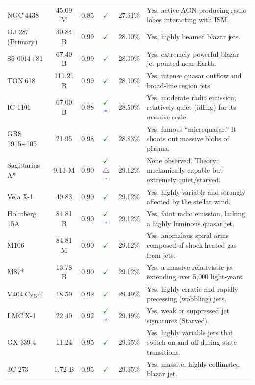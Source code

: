 \documentclass[11pt, a4paper]{article}
\begin{document}
\begin{landscape}
\begin{longtable}[l]{@{} l c c c c p{14cm} @{}}
  NGC 4438 & 45.09 M & 0.85 & \textcolor{green}{\Large $\checkmark$} & 27.61\% & Yes, active AGN producing radio lobes interacting with ISM. \\
  OJ 287 (Primary) & 30.84 B & 0.99 & \textcolor{green}{\Large $\checkmark$} & 28.00\% & Yes, highly beamed blazar jets. \\
  S5 0014+81 & 67.40 B & 0.99 & \textcolor{green}{\Large $\checkmark$} & 28.00\% & Yes, extremely powerful blazar jet pointed near Earth. \\
  TON 618 & 111.21 B & 0.99 & \textcolor{green}{\Large $\checkmark$} & 28.00\% & Yes, intense quasar outflow and broad-line region jets. \\
  IC 1101 & 67.00 B & 0.88 & \textcolor{green}{\Large $\checkmark$} \textcolor{blue}{\Large $*$} & 28.50\% & Yes, moderate radio emission; relatively quiet (idling) for its massive scale. \\
  GRS 1915+105 & 21.95 & 0.98 & \textcolor{green}{\Large $\checkmark$} & 28.83\% & Yes, famous ``microquasar.'' It shoots out massive blobs of plasma. \\
  Sagittarius A* & 9.11 M & 0.90 & \textcolor{green}{\Large $\checkmark$} \textcolor{purple}{\Large $\triangle$} \textcolor{blue}{\Large $*$} & 29.12\% & None observed. Theory: mechanically capable but extremely quiet/starved. \\
  Vela X-1 & 49.83 & 0.90 & \textcolor{green}{\Large $\checkmark$} & 29.12\% & Yes, highly variable and strongly affected by the stellar wind. \\
  Holmberg 15A & 84.81 B & 0.90 & \textcolor{green}{\Large $\checkmark$} \textcolor{blue}{\Large $*$} & 29.12\% & Yes, faint radio emission, lacking a highly luminous quasar jet. \\
  M106 & 84.81 M & 0.90 & \textcolor{green}{\Large $\checkmark$} & 29.12\% & Yes, anomalous spiral arms composed of shock-heated gas from jets. \\
  M87* & 13.78 B & 0.90 & \textcolor{green}{\Large $\checkmark$} & 29.12\% & Yes, a massive relativistic jet extending over 5,000 light-years. \\
  V404 Cygni & 18.50 & 0.92 & \textcolor{green}{\Large $\checkmark$} & 29.49\% & Yes, highly erratic and rapidly precessing (wobbling) jets. \\
  LMC X-1 & 22.40 & 0.92 & \textcolor{green}{\Large $\checkmark$} \textcolor{blue}{\Large $*$} & 29.49\% & Yes, weak or suppressed jet signatures (Starved). \\
  GX 339-4 & 11.24 & 0.95 & \textcolor{green}{\Large $\checkmark$} & 29.65\% & Yes, highly variable jets that switch on and off during state transitions. \\
  3C 273 & 1.72 B & 0.95 & \textcolor{green}{\Large $\checkmark$} & 29.65\% & Yes, massive, highly collimated blazar jet. \\
  \bottomrule
\end{longtable}


\end{landscape}
\end{document}
